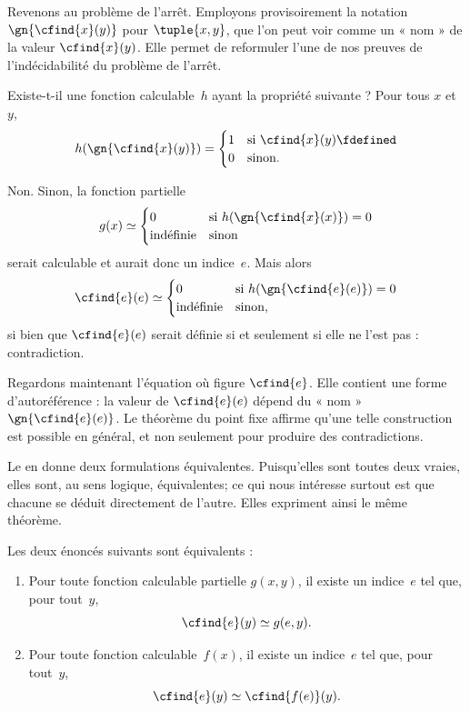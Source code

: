 \documentclass[../../../include/open-logic-section]{subfiles}
\begin{document}

Revenons au problème de l'arrêt. Employons
provisoirement la notation
$\gn{\cfind{x}(y)}$ pour $\tuple{x,y}$,
que l'on peut voir comme un « nom » de la valeur
$\cfind{x}(y)$. Elle permet de reformuler
l'une de nos preuves de l'indécidabilité du
problème de l'arrêt.

Existe-t-il une fonction calculable~$h$
ayant la propriété suivante ? Pour tous
$x$ et~$y$,
\[
h(\gn{\cfind{x}(y)}) =
\begin{cases}
1 & \text{si $\cfind{x}(y) \fdefined$} \\
0 & \text{sinon.}
\end{cases}
\]

Non. Sinon, la fonction partielle
\[
g(x) \simeq
\begin{cases}
0 & \text{si $h(\gn{\cfind{x}(x)}) = 0$} \\
\text{indéfinie} & \text{sinon}
\end{cases}
\]
serait calculable et aurait donc un indice~$e$.
Mais alors
\[
\cfind{e}(e) \simeq
\begin{cases}
0 & \text{si $h(\gn{\cfind{e}(e)}) = 0$} \\
\text{indéfinie} & \text{sinon,}
\end{cases}
\]
si bien que $\cfind{e}(e)$ serait définie si
et seulement si elle ne l'est pas : contradiction.

Regardons maintenant l'équation où figure
$\cfind{e}$. Elle contient une forme
d'autoréférence : la valeur de $\cfind{e}(e)$
dépend du « nom » $\gn{\cfind{e}(e)}$.
Le théorème du point fixe affirme qu'une telle
construction est possible en général, et non
seulement pour produire des contradictions.

Le  en donne deux
formulations équivalentes. Puisqu'elles sont
toutes deux vraies, elles sont, au sens logique,
équivalentes; ce qui nous intéresse surtout est
que chacune se déduit directement de l'autre.
Elles expriment ainsi le même théorème.

\begin{lem}
Les deux énoncés suivants sont équivalents :
\begin{enumerate}
\item Pour toute fonction calculable partielle
  $g(x,y)$, il existe un indice~$e$ tel que,
  pour tout~$y$,
\[
\cfind{e}(y) \simeq g(e,y).
\]
\item Pour toute fonction calculable~$f(x)$,
  il existe un indice~$e$ tel que, pour tout~$y$,
\[
\cfind{e}(y) \simeq \cfind{f(e)}(y).
\]
\end{enumerate}
\end{lem}
\end{document}

